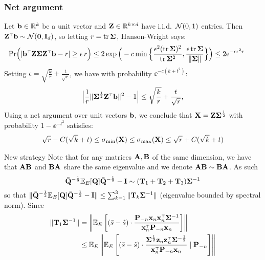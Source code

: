 \documentclass[10pt]{beamer}
\begin{document}
\begin{frame}
  \frametitle{Net argument}
  Let $\mathbf b\in\mathbb R^k$ be a unit vector and 
  $\mathbf Z\in \mathbb R^{k\times d}$ have
  i.i.d.~$\mathcal{N}(0,1)$ entries. Then $\Z^\top\b\sim \Nc(\zero,\I_d)$,
so letting $r=\mathrm{tr}\,\mathbf{\Sigma}$, Hanson-Wright says:
  \begin{align*}
\hspace{-6mm}\Pr\Big(|\b^\top\Z\Sigmab\Z^\top\b-r|\geq
    \epsilon\,r\Big)\leq  
    2\exp\Big(-c\min\Big\{\frac{\epsilon^2(\tr\,\Sigmab)^2}{\tr\,\Sigmab^2},
    \frac{\epsilon\,\tr\,\Sigmab}{\|\Sigmab\|}\Big\}\Big)
    \leq 2\ee^{-c\epsilon^2 r}
  \end{align*}
  Setting $\epsilon = \sqrt{\frac kr} + \frac t{\sqrt r}$, we have with
  probability $\ee^{-c(k+t^2)}$:
  \begin{align*}
    \Big|\frac1r\|\Sigmab^{\frac12}\Z^\top\b\|^2-1\Big|\leq \sqrt{\frac kr} + \frac t{\sqrt r},
  \end{align*}
Using a net argument over unit vectors $\mathbf b$, we conclude that $\mathbf X=\mathbf Z\mathbf{\Sigma}^{\frac12}$ with
probability $1-\ee^{-t^2}$ satisfies:
\begin{align*}
  \sqrt r - C(\sqrt k +t)\leq \sigma_{\min}(\mathbf X)\leq
  \sigma_{\max}(\mathbf X)\leq\sqrt r+C(\sqrt k+t)
\end{align*}
\end{frame}

\begin{frame}{New strategy}
Note that for any matrices $\mathbf A, \mathbf B$ of the same dimension, we have that $\mathbf A\mathbf B$ and $\mathbf B \mathbf A$ share the same eigenvalue and we denote $\mathbf A\mathbf B \sim \mathbf B\mathbf A$. As such
\[
  \bar {\mathbf Q}^{-\frac12} \mathbb E_E[\mathbf Q] \bar {\mathbf Q}^{-\frac12} - \mathbf I \sim (\mathbf{T}_1 + \mathbf{T}_2 + \mathbf{T}_3) \mathbf{\Sigma}^{-1}
\]
so that $\| \bar {\mathbf Q}^{-\frac12} \mathbb E_E[\mathbf Q] \bar {\mathbf Q}^{-\frac12} - \mathbf I \| \le \sum_{k=1}^3 \| \mathbf{T}_k \mathbf{\Sigma}^{-1} \|$ (eigenvalue bounded by spectral norm). Since 
\begin{align*}
  \| \T_1 \Sigmab^{-1} \| & = \left\| \E_E \left[ (\bar s - \hat s) \cdot \frac{ \P_{-n} \x_n \x_n^\top \Sigmab^{-1} }{\x_n^\top \P_{-n} \x_n} \right] \right\| \\ 
  &\le \E_E \left\| \E_E \left[ (\bar s - \hat s) \cdot \frac{ \Sigmab^{\frac12} \z_n \z_n^\top \Sigmab^{-\frac12} }{\x_n^\top \P_{-n} \x_n} \mid \P_{-n} \right] \right\| 
\end{align*}
\end{frame}
 
\end{document}
